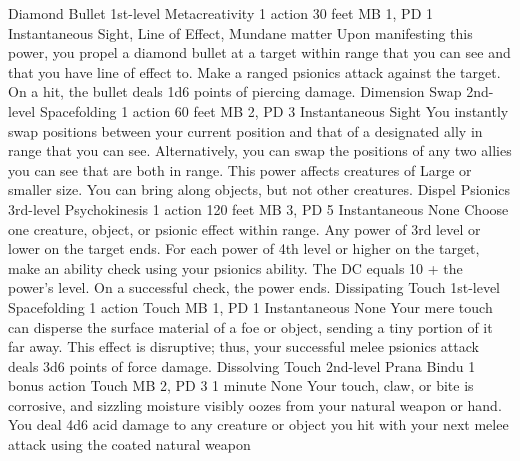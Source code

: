 \DndPowerHeader%
    {Diamond Bullet\label{pwr:diamond-bullet}}
    {1st-level Metacreativity}
    {1 action}
    {30 feet}
    {MB 1, PD 1}
    {Instantaneous}
    {Sight, Line of Effect, Mundane matter}
Upon manifesting this power, you propel a
diamond bullet at a target within range that you can see and
that you have line of effect to. Make a ranged psionics attack
against the target. On a hit, the bullet deals 1d6 points
of piercing damage.
\DndPowerHeader%
    {Dimension Swap\label{pwr:dimension-swap}}
    {2nd-level Spacefolding}
    {1 action}
    {60 feet}
    {MB 2, PD 3}
    {Instantaneous}
    {Sight}
You instantly swap positions between your
current position and that of a designated ally in range that
you can see. Alternatively, you can swap the positions of
any two allies you can see that are both in range. This power
affects creatures of Large or smaller size. You can bring
along objects, but not other creatures.
\DndPowerHeader%
    {Dispel Psionics\label{pwr:dispel-psionics}}
    {3rd-level Psychokinesis}
    {1 action}
    {120 feet}
    {MB 3, PD 5}
    {Instantaneous}
    {None}
Choose one creature, object, or psionic effect
within range. Any power of 3rd level or lower on the target
ends. For each power of 4th level or higher on the target,
make an ability check using your psionics ability. The DC
equals 10 + the power's level. On a successful check, the
power ends.
\DndPowerHeader%
    {Dissipating Touch\label{pwr:dissipating-touch}}
    {1st-level Spacefolding}
    {1 action}
    {Touch}
    {MB 1, PD 1}
    {Instantaneous}
    {None}
Your mere touch can disperse the surface
material of a foe or object, sending a tiny portion of it
far away. This effect is disruptive; thus, your successful
melee psionics attack deals 3d6 points of force damage.
\DndPowerHeader%
    {Dissolving Touch\label{pwr:dissolving-touch}}
    {2nd-level Prana Bindu}
    {1 bonus action}
    {Touch}
    {MB 2, PD 3}
    {1 minute}
    {None}
Your touch, claw, or bite is corrosive, and
sizzling moisture visibly oozes from your natural weapon or
hand. You deal 4d6 acid damage to any creature or object you
hit with your next melee attack using the coated natural weapon
